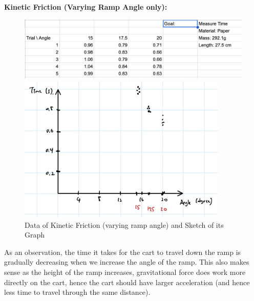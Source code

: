 \documentclass{article}
\begin{document}
\textbf{Kinetic Friction (Varying Ramp Angle only):}
\begin{figure}[h!]
    \centering
    \includegraphics[width=150mm]{kinetic_data.png}

    \hfil

    \includegraphics[width=100mm]{kinetic.jpg}
    \caption{Data of Kinetic Friction (varying ramp angle) and Sketch of its Graph}
\end{figure}

\hfil

As an observation, the time it takes for the cart to travel down the ramp is gradually decreasing when we increase the angle of the ramp. This also makes sense as the height of the ramp increases, gravitational force does work more directly on the cart, hence the cart should have larger acceleration (and hence less time to travel through the same distance).
\end{document}
